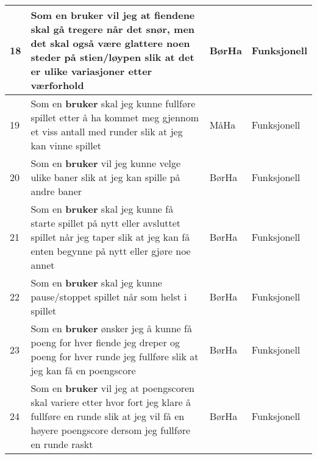 \documentclass[norsk,a4paper]{article}
\begin{document}
\begin{center}
\begin{tabular}{ | p{} | p{6cm} | p{2cm} | p{3cm} |}
    18 & Som en \textbf{bruker} vil jeg at fiendene skal gå tregere når det snør, men det skal også være glattere noen steder på stien/løypen slik at det er ulike variasjoner etter værforhold & BørHa & Funksjonell \\ \hline
    
    19 & Som en \textbf{bruker} skal jeg kunne fullføre spillet etter å ha kommet meg gjennom et viss antall med runder slik at jeg kan vinne spillet & MåHa & Funksjonell \\ \hline
    
    20 & Som en \textbf{bruker} vil jeg kunne velge ulike baner slik at jeg kan spille på andre baner & BørHa & Funksjonell \\ \hline
    
    21 & Som en \textbf{bruker} skal jeg kunne få starte spillet på nytt eller avsluttet spillet når jeg taper slik at jeg kan få enten begynne på nytt eller gjøre noe annet  & BørHa & Funksjonell \\ \hline
       
   22 & Som en \textbf{bruker} skal jeg kunne pause/stoppet spillet når som helst i spillet & BørHa & Funksjonell \\ \hline
   
   23 & Som en \textbf{bruker} ønsker jeg å kunne få poeng for hver fiende jeg dreper og poeng for hver runde jeg fullføre slik at jeg kan få en poengscore  & BørHa & Funksjonell 
   \\ \hline
   
   24 & Som en \textbf{bruker} vil jeg at poengscoren skal variere etter hvor fort jeg klare å fullføre en runde slik at jeg vil få en høyere poengscore dersom jeg fullføre en runde raskt & BørHa & Funksjonell \\ \hline 
    
\end{tabular}
\end{center} 
\end{document}
